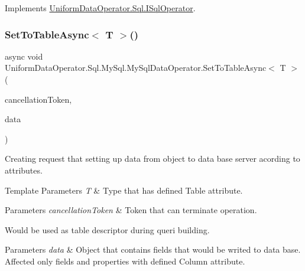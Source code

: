 Implements \mbox{\hyperlink{interface_uniform_data_operator_1_1_sql_1_1_i_sql_operator_a1072f029395858ff11d574ac09011332}{Uniform\+Data\+Operator.\+Sql.\+I\+Sql\+Operator}}.

\mbox{\label{class_uniform_data_operator_1_1_sql_1_1_my_sql_1_1_my_sql_data_operator_a31e1837ecb4c58bbd39a31fa9cf51962}} 
\subsubsection{\texorpdfstring{Set\+To\+Table\+Async$<$ T $>$()}{SetToTableAsync< T >()}}
{\footnotesize\ttfamily async void Uniform\+Data\+Operator.\+Sql.\+My\+Sql.\+My\+Sql\+Data\+Operator.\+Set\+To\+Table\+Async$<$ T $>$ (\begin{DoxyParamCaption}\item[{Cancellation\+Token}]{cancellation\+Token,  }\item[{object}]{data }\end{DoxyParamCaption})}



Creating request that setting up data from object to data base server acording to attributes. 


\begin{DoxyTemplParams}{Template Parameters}
{\em T} & Type that has defined Table attribute. 
\begin{DoxyParams}{Parameters}
{\em cancellation\+Token} & Token that can terminate operation.\\
\hline
\end{DoxyParams}
Would be used as table descriptor during queri building.\\
\hline
\end{DoxyTemplParams}

\begin{DoxyParams}{Parameters}
{\em data} & Object that contains fields that would be writed to data base. Affected only fields and properties with defined Column attribute.\\
\hline
\end{DoxyParams}


